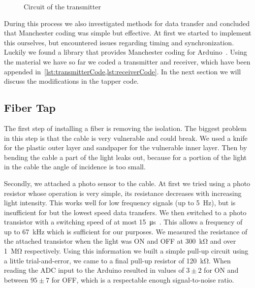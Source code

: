 \documentclass[11pt,twoside,a4paper]{scrartcl}
\begin{document}
		\begin{figure}
			\centering
			\caption{Circuit of the transmitter}
			\label{fig:transmitter}
		\end{figure}

		During this process we also investigated methods for data transfer and concluded that Manchester coding was simple but effective.
		At first we started to implement this ourselves, but encountered issues regarding timing and synchronization.
		Luckily we found a library that provides Manchester coding for Arduino~\cite{manchestercoding}.
		Using the material we have so far we coded a transmitter and receiver, which have been appended in~\cref{lst:transmitterCode,lst:receiverCode}.
		In the next section we will discuss the modifications in the tapper code.

	\subsection{Fiber Tap}
		The first step of installing a fiber is removing the isolation.
		The biggest problem in this step is that the cable is very vulnerable and could break.
		We used a knife for the plastic outer layer and sandpaper for the vulnerable inner layer.
		Then by bending the cable a part of the light leaks out,
		because for a portion of the light in the cable the angle of incidence is too small.

		Secondly, we attached a photo sensor to the cable.
		At first we tried using a photo resistor whose operation is very simple,
		its resistance decreases with increasing light intensity.
		This works well for low frequency signals (up to \SI{5}{\hertz}),
		but is insufficient for but the lowest speed data transfers.
		We then switched to a photo transistor with a switching speed of at most \SI{15}{\micro\second}~\cite{phototransistor}.
		This allows a frequency of up to \SI{67}{\kilo\hertz} which is sufficient for our purposes.
		We measured the resistance of the attached transistor when the light was ON and OFF
		at \SI{300}{\kilo\ohm} and over \SI{1}{\mega\ohm} respectively.
		Using this information we built a simple pull-up circuit using a little trial-and-error,
		we came to a final pull-up resistor of \SI{120}{\kilo\ohm}.
		When reading the ADC input to the Arduino resulted in values of $3 \pm 2$ for ON and between $95 \pm 7$ for OFF,
		which is a respectable enough signal-to-noise ratio.
\end{document}
